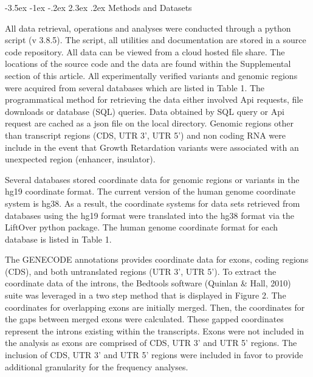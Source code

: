 \documentclass[11pt]{article}
\makeatletter
\renewcommand\section{\@startsection {section}{1}{\z@}%
                                       {-3.5ex \@plus -1ex \@minus -.2ex}%
                                       {2.3ex \@plus.2ex}%
                                       {\normalfont\fontfamily{phv}\fontsize{16}{19}\bfseries}}
\makeatother
\begin{document}
\section{Methods and Datasets} \label{s:methods}

 

All data retrieval, operations and analyses were conducted through a python script (v 3.8.5). The script, all utilities and documentation are stored in a source code repository. All data can be viewed from a cloud hosted file share. The locations of the source code and the data are found within the Supplemental section of this article. All experimentally verified variants and genomic regions were acquired from several databases which are listed in Table 1. The programmatical method for retrieving the data either involved Api requests, file downloads or database (SQL) queries. Data obtained by SQL query or Api request are cached as a json file on the local directory. Genomic regions other than transcript regions (CDS, UTR 3’, UTR 5’) and non coding RNA were include in the event that Growth Retardation variants were associated with an unexpected region (enhancer, insulator). 

Several databases stored coordinate data for genomic regions or variants in the hg19 coordinate format. The current version of the human genome coordinate system is hg38. As a result, the coordinate systems for data sets retrieved from databases using the hg19 format were translated into the hg38 format via the LiftOver python package. The human genome coordinate format for each database is listed in Table 1. 

The GENECODE annotations provides coordinate data for exons, coding regions (CDS), and both untranslated regions (UTR 3’, UTR 5’). To extract the coordinate data of the introns, the Bedtools software (Quinlan & Hall, 2010) suite was leveraged in a two step method that is displayed in Figure 2. The coordinates for overlapping exons are initially merged. Then, the coordinates for the gaps between merged exons were calculated. These gapped coordinates represent the introns existing within the transcripts. Exons were not included in the analysis as exons are comprised of CDS, UTR 3’ and UTR 5’ regions. The inclusion of CDS, UTR 3’ and UTR 5’ regions were included in favor to provide additional granularity for the frequency analyses. 
\end{document}

